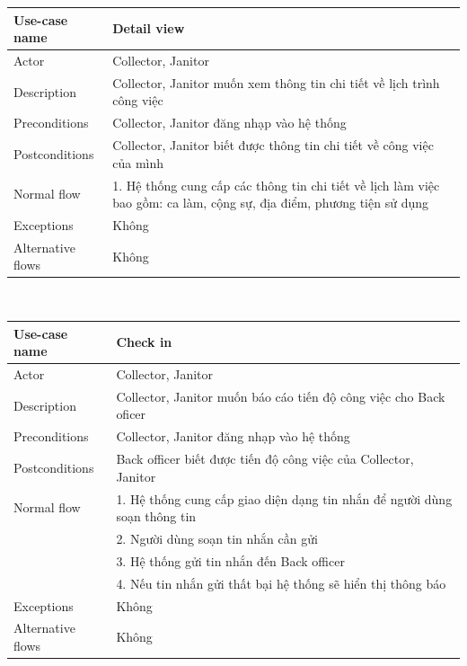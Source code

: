 \documentclass[a4paper]{article}
\begin{document}
\begin{enumerate}
 \begin{tabular}{| p{3cm} | p{10cm} |}
  \hline
     Use-case name & Detail view
     \\
     \hline
     Actor & Collector, Janitor
     \\ \hline
     Description & Collector, Janitor muốn xem thông tin chi tiết về lịch trình công việc 
      \\
     \hline
     Preconditions & Collector, Janitor đăng nhạp vào hệ thống\\
          \hline
     Postconditions & Collector, Janitor biết được thông tin chi tiết về công việc của mình
     \\ \hline
      Normal flow & 1. Hệ thống cung cấp các thông tin chi tiết về lịch làm việc bao gồm: ca làm, cộng sự, địa điểm, phương tiện sử dụng\\
      \hline
     Exceptions & Không 
     \\ \hline
     Alternative flows & Không
     \\ \hline
\end{tabular}\\
\vspace{0.5cm}

 \begin{tabular}{| p{3cm} | p{10cm} |}
  \hline
     Use-case name & Check in
     \\
     \hline
     Actor & Collector, Janitor
     \\ \hline
     Description & Collector, Janitor muốn báo cáo tiến độ công việc cho Back oficer
      \\
     \hline
     Preconditions & Collector, Janitor đăng nhạp vào hệ thống\\
          \hline
     Postconditions & Back officer biết được tiến độ công việc của Collector, Janitor
     \\ \hline
      Normal flow & 1. Hệ thống cung cấp giao diện dạng tin nhắn để người dùng soạn thông tin\\

         & 2. Người dùng soạn tin nhắn cần gửi\\
        & 3. Hệ thống gửi tin nhắn đến Back officer \\
        & 4. Nếu tin nhắn gửi thất bại hệ thống sẽ hiển thị thông báo \\
      \hline
     Exceptions & Không 
     \\ \hline
     Alternative flows & Không
     \\ \hline
\end{tabular}\\
\vspace{0.5cm}


\end{enumerate}
\end{document}
